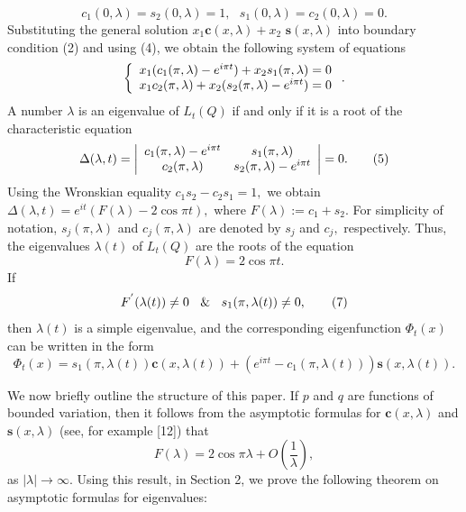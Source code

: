 \documentclass{article}%
\begin{document}
\begin{equation}
c_{1}(0,\lambda)=s_{2}(0,\lambda)=1,\text{ }s_{1}(0,\lambda)=c_{2}%
(0,\lambda)=0.\tag{4}%
\end{equation}
Substituting the general solution $x_{1}\mathbf{c}(x,\lambda)+x_{2}$
$\mathbf{s}(x,\lambda)$ into boundary condition (2) and using (4), we obtain
the following system of equations
\[
\left\{
\begin{array}
[c]{c}%
x_{1}(c_{1}(\pi,\lambda)-e^{i\pi t})+x_{2}s_{1}(\pi,\lambda)=0\\
x_{1}c_{2}(\pi,\lambda)+x_{2}(s_{2}(\pi,\lambda)-e^{i\pi t})=0
\end{array}
\right.  .
\]
A number $\lambda$ is an eigenvalue of $L_{t}(Q)$ if and only if it is a root
of the characteristic equation
\begin{equation}
\Delta(\lambda,t)=\left\vert
\begin{array}
[c]{cc}%
c_{1}(\pi,\lambda)-e^{i\pi t} & s_{1}(\pi,\lambda)\\
c_{2}(\pi,\lambda) & s_{2}(\pi,\lambda)-e^{i\pi t}%
\end{array}
\right\vert =0.\tag{5}%
\end{equation}
Using the Wronskian equality $c_{1}s_{2}-c_{2}s_{1}=1,$ we obtain
$\Delta(\lambda,t)=e^{it}(F(\lambda)-2\cos\pi t),$ where $F(\lambda
):=c_{1}+s_{2}.$ For simplicity of notation, $s_{j}(\pi,\lambda)$ and
$c_{j}(\pi,\lambda)$ are denoted by $s_{j}$ and $c_{j},$ respectively. Thus,
the eigenvalues $\lambda(t)$ of $L_{t}(Q)$ are the roots of the equation%
\begin{equation}
F(\lambda)=2\cos\pi t.\tag{6}%
\end{equation}
If
\begin{equation}
F^{^{\prime}}(\lambda(t))\neq0\text{ }\And\text{ }s_{1}(\pi,\lambda
(t))\neq0,\tag{7}%
\end{equation}
then $\lambda(t)$ is a simple eigenvalue, and the corresponding eigenfunction
$\Phi_{t}(x)$ can be written in the form
\begin{equation}
\Phi_{t}(x)=s_{1}(\pi,\lambda(t))\mathbf{c}(x,\lambda(t))+\left(  e^{i\pi
t}-c_{1}(\pi,\lambda(t))\right)  \mathbf{s}(x,\lambda(t)).\tag{8}%
\end{equation}


We now briefly outline the structure of this paper. If $p$ and $q$ are
functions of bounded variation, then it follows from the asymptotic formulas
for $\mathbf{c}(x,\lambda)$ and $\mathbf{s}(x,\lambda)$ (see, for example
[12]) that
\begin{equation}
F(\lambda)=2\cos\pi\lambda+O\left(  \frac{1}{\lambda}\right)  , \tag{9}%
\end{equation}
as $\left\vert \lambda\right\vert \rightarrow\infty.$ Using this result, in
Section 2, we prove the following theorem on asymptotic formulas for eigenvalues:
\end{document}

